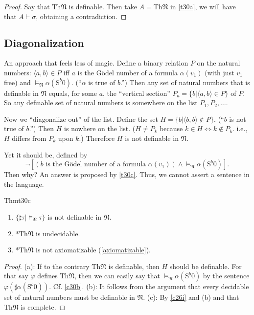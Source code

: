 \begin{proof}
  Say that $\mathrm{Th}\mathfrak N$ is definable. Then take $A=\mathrm{Th}\mathfrak N$ in \ref{t30a}, we will have that $A\vdash \sigma$, obtaining a contradiction.
\end{proof}

\subsection*{Diagonalization}

An approach that feels less of magic. Define a binary relation $P$ on the natural numbers: $\langle a,b\rangle\in P$ iff $a$ is the G\"odel number of a formula $\alpha(v_1)$ (with just $v_1$ free) and $\vDash_{\mathfrak N}\alpha(\mathrm{S}^b \mathrm{0}).$ (``$\alpha$ is true of $b$.'') Then any set of natural numbers that is definable in $\mathfrak N$ equals, for some $a$, the ``vertical section'' $P_a=\{b|\langle a,b\rangle\in P\}$ of $P$. So any definable set of natural numbers is somewhere on the list $P_1,P_2,\dots$.

Now we ``diagonalize out'' of the list. Define the set $H=\{b|\langle b,b\rangle\notin P\}.$ (``$b$ is not true of $b$.'') Then $H$ is nowhere on the list. ($H\neq P_k$ because $k\in H \Leftrightarrow k\notin P_k$. i.e., $H$ differs from $P_k$ upon $k$.) Therefore $H$ is not definable in $\mathfrak N$.

Yet it should be, defined by
\[
  \neg[\left(b\text{ is the G\"odel number of a formula }\alpha(v_1)\right)\wedge\vDash_{\mathfrak N}\alpha(\mathrm{S}^b \mathrm{0})].
\]
Then why? An answer is proposed by \ref{t30c}. Thus, we cannot assert a sentence in the language.


\begin{reference}{Thm}{t30c}
  \begin{enumerate}[label=(\alph*)]
    \item $\{\sharp \tau|\vDash_{\mathfrak N}\tau\}$ is not definable in $\mathfrak N$.
    \item*$\mathrm{Th}\mathfrak N$ is undecidable.
    \item*$\mathrm{Th}\mathfrak N$ is not axiomatizable (\ref{axiomatizable}).\qedhere
  \end{enumerate}
\end{reference}

\begin{proof}
  (a): If to the contrary $\mathrm{Th}\mathfrak N$ is definable, then $H$ should be definable. For that say $\varphi$ defines $\mathrm{Th}\mathfrak N$, then we can easily say that $\vDash_{\mathfrak N}\alpha(\mathrm{S}^b \mathrm{0})$ by the sentence $\varphi(\sharp\alpha(\mathrm{S}^b \mathrm{0}))$. Cf. \ref{c30b}.\newline
  (b): It follows from the argument that every decidable set of natural numbers must be definable in $\mathfrak N$.\newline
  (c): By \ref{c26i} and (b) and that $\mathrm{Th}\mathfrak N$ is complete.
\end{proof}

